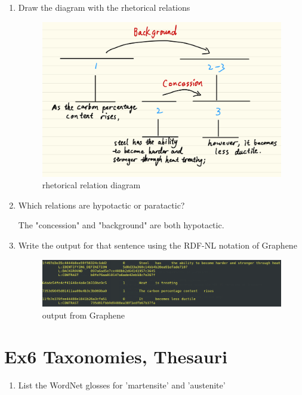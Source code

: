 \documentclass[12pt]{article}
\begin{document}
{\begin{enumerate}[1.]
	satellites: "As the carbon percentage content rises, steel has the ability to become harder 
	and stronger through heat treating;"
	\item Draw the diagram with the rhetorical relations
	\begin{figure}[ht]
		\centering
		\includegraphics[scale=0.15]{figs/rhetorical_structure.jpg}
		\caption{rhetorical relation diagram}
		\label{fig:label6}
	\end{figure}
	\item Which relations are hypotactic or paratactic?
	
	The "concession" and "background" are both hypotactic.
	\item Write the output for that sentence using the RDF-NL notation of Graphene
	\begin{figure}[ht]
		\centering
		\includegraphics[scale=0.3]{figs/Graphene_output.png}
		\caption{output from Graphene}
		\label{fig:label7}
	\end{figure}
	
\end{enumerate}

\newpage
\section{Ex6 Taxonomies, Thesauri}
\label{sec: ex6}
\begin{enumerate}[1.]
	\item List the WordNet glosses for 'martensite' and 'austenite'
	

\end{enumerate}}
\end{document}
